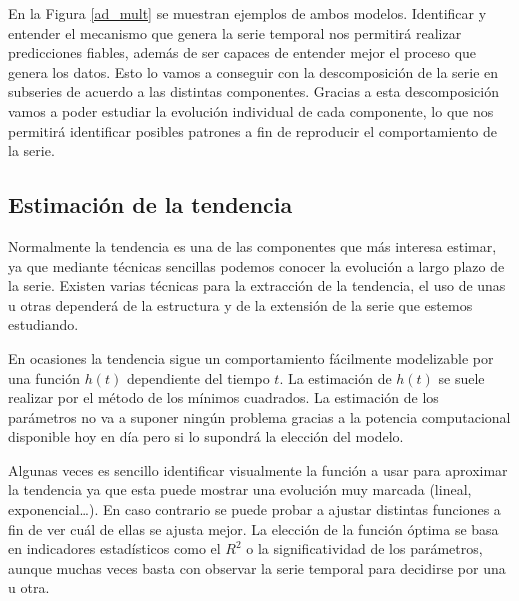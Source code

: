 En la Figura \ref{ad_mult} se muestran ejemplos de ambos modelos. Identificar y entender el mecanismo que genera la serie temporal nos permitirá realizar predicciones fiables, además de ser capaces de entender mejor el proceso que genera los datos. Esto lo vamos a conseguir con la descomposición de la serie en subseries de acuerdo a las distintas componentes. Gracias a esta descomposición vamos a poder estudiar la evolución individual de cada componente, lo que nos permitirá identificar posibles patrones a fin de reproducir el comportamiento de la serie.

\subsection{Estimación de la tendencia}

Normalmente la tendencia es una de las componentes que más interesa estimar, ya que mediante técnicas sencillas podemos conocer la evolución a largo plazo de la serie. Existen varias técnicas para la extracción de la tendencia, el uso de unas u otras dependerá de la estructura y de la extensión de la serie que estemos estudiando.

En ocasiones la tendencia sigue un comportamiento fácilmente modelizable por una función $h(t)$ dependiente del tiempo $t$. La estimación de $h(t)$ se suele realizar por el método de los mínimos cuadrados. La estimación de los parámetros no va a suponer ningún problema gracias a la potencia computacional disponible hoy en día pero si lo supondrá la elección del modelo.

Algunas veces es sencillo identificar visualmente la función a usar para aproximar la tendencia ya que esta puede mostrar una evolución muy marcada (lineal, exponencial…). En caso contrario se puede probar a ajustar distintas funciones a fin de ver cuál de ellas se ajusta mejor. La elección de la función óptima se basa en indicadores estadísticos como el $R^2$ o la significatividad de los parámetros, aunque muchas veces basta con observar la serie temporal para decidirse por una u otra.

